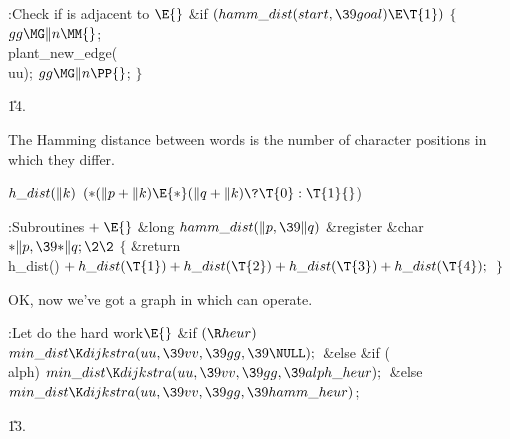 \Y\B\4:Check if  is adjacent to \X${}\E{}$\6
\&{if} ${}(\\{hamm\_dist}(\\{start},\39\\{goal})\E\T{1}){}$\5
${}\{{}$\1\6
${}\\{gg}\MG\|n\MM{}$;\6
\\{plant\_new\_edge}(\\{uu});\6
${}\\{gg}\MG\|n\PP{}$;\6
\4${}\}{}$\2\par
\U14.\fi

The Hamming distance between words is the number of character positions
in which they differ.

\Y\B\4\D$\\{h\_dist}(\|k)$ \5
$({*}(\|p+\|k)\E{*}(\|q+\|k)\?\T{0}:\T{1}{}$)\par
\Y\B\4:Subroutines\X${}\mathrel+\E{}$\6
\1\1\&{long} ${}\\{hamm\_dist}(\|p,\39\|q){}$\6
\&{register} \&{char} ${}{*}\|p,\39{*}\|q;\2\2{}$\6
${}\{{}$\1\6
\&{return} \\{h\_dist}()${}+\\{h\_dist}(\T{1})+\\{h\_dist}(\T{2})+\\{h%
\_dist}(\T{3})+\\{h\_dist}(\T{4});{}$\6
\4${}\}{}$\2\par
\fi

OK, now we've got a graph in which  can operate.

\Y\B\4:Let  do the hard work\X${}\E{}$\6
\&{if} ${}(\R\\{heur}){}$\1\5
${}\\{min\_dist}\K\\{dijkstra}(\\{uu},\39\\{vv},\39\\{gg},\39\NULL);{}$\2\6
\&{else} \&{if} (\\{alph})\1\5
${}\\{min\_dist}\K\\{dijkstra}(\\{uu},\39\\{vv},\39\\{gg},\39\\{alph%
\_heur});{}$\2\6
\&{else}\1\5
${}\\{min\_dist}\K\\{dijkstra}(\\{uu},\39\\{vv},\39\\{gg},\39\\{hamm%
\_heur}){}$;\2\par
\U13.\fi

